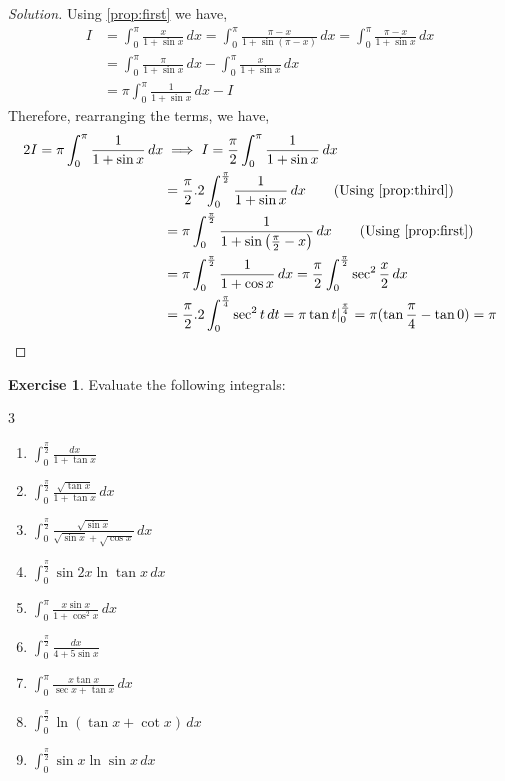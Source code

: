 \documentclass{book}
\theoremstyle{definition}
\newtheorem{exercise}{Exercise}[section]
\newenvironment{solution}
    {\begin{proof}[Solution]}
    {\end{proof}}
\begin{document}
\begin{solution}
Using \ref{prop:first} we have,
\begin{align*}
I&=\int_0^{\pi}\frac{x}{1+\sin x}\,dx = \int_0^{\pi}\frac{\pi-x}{1+\sin (\pi-x)}\,dx= \int_0^{\pi}\frac{\pi-x}{1+\sin x}\,dx \\
&= \int_0^{\pi}\frac{\pi}{1+\sin x}\,dx-\int_0^{\pi}\frac{x}{1+\sin x}\,dx \\ 
&= \pi\int_0^{\pi}\frac{1}{1+\sin x}\,dx-I
\end{align*}
Therefore, rearranging the terms, we have,
\begin{align*}
2I=\pi\int_0^{\pi}\frac{1}{1+\sin x}\,dx &\implies I = \frac{\pi}{2}\int_0^{\pi}\frac{1}{1+\sin x}\,dx \\
&= \frac{\pi}{2}.2\displaystyle\int_0^{\frac{\pi}{2}}\frac{1}{1+\sin x}\,dx \qquad \text{(Using \ref{prop:third})} \\
&= \pi\int_0^{\frac{\pi}{2}}\frac{1}{1+\sin \left(\frac{\pi}{2}-x\right)}\,dx \qquad \text{(Using \ref{prop:first})} \\
&= \pi\int_0^{\frac{\pi}{2}}\frac{1}{1+\cos x}\,dx = \frac{\pi}{2}\int_0^{\frac{\pi}{2}}\sec^2\frac{x}{2}\,dx \\
&= \frac{\pi}{2}.2\displaystyle\int_0^{\frac{\pi}{4}}\sec^2t\,dt = \pi\tan t\vert_0^{\frac{\pi}{4}} = \pi(\tan\frac{\pi}{4}-\tan 0) =\pi
\end{align*}
\end{solution}

\begin{exercise}
 Evaluate the following integrals:
\begin{multicols}{3}
\begin{enumerate}[label=(\roman*)]
    \item $\displaystyle\int_0^{\frac{\pi}{2}}\frac{dx}{1+\tan x}$
    \item $\displaystyle\int_0^{\frac{\pi}{2}}\frac{\sqrt{\tan x}}{1+\tan x}\,dx$
    \item $\displaystyle\int_0^{\frac{\pi}{2}}\frac{\sqrt{\sin x}}{\sqrt{\sin x}+\sqrt{\cos x}}\,dx$
    \item $\displaystyle\int_0^{\frac{\pi}{2}}\sin 2x \ln \tan x\,dx$
    \item $\displaystyle\int_0^{\pi}\frac{x\sin x}{1+\cos^2 x}\,dx$
    \item $\displaystyle\int_0^{\frac{\pi}{2}}\frac{dx}{4+5\sin x}$
    \item $\displaystyle\int_0^{\pi}\frac{x\tan x}{\sec x+\tan x}\,dx$ 
    \item $\displaystyle\int_0^{\frac{\pi}{2}}\ln(\tan x+\cot x)\,dx$
    \item $\displaystyle\int_0^{\frac{\pi}{2}}\sin x \ln \sin x\,dx$

\end{enumerate}
\end{multicols}
\end{exercise}
\end{document}
